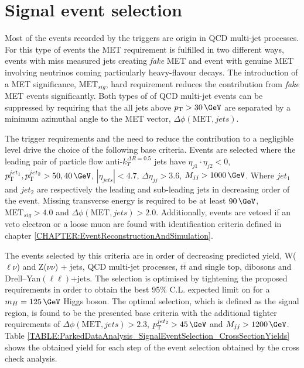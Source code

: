 \section{Signal event selection}
\label{SECTION:ParkedDataAnalysis_SignalEventSelection}


Most of the events recorded by the triggers are origin in \gls{QCD} multi-jet processes. For this type of events the \gls{MET} requirement is fulfilled in two different ways, events with miss measured jets creating \textit{fake} \gls{MET} and event with genuine \gls{MET} involving neutrinos coming particularly heavy-flavour decays. The introduction of a \gls{MET} significance, $\text{MET}_{sig}$, hard requirement reduces the contribution from \textit{fake} \gls{MET} events significantly. Both types of of \gls{QCD} multi-jet events can be suppressed by requiring that the all jets above $\pt>30\,\GeV$ are separated by a minimum azimuthal angle to the \gls{MET} vector, $\Delta\phi(\text{MET},jets)$.

The trigger requirements and the need to reduce the contribution to a negligible level drive the choice of the following base criteria. Events are selected where the leading pair of particle flow anti-$k_T^{\Delta R=0.5}$ jets have $\eta_{j1} \cdot \eta_{j2}<0$, $\pt^{jet_1},\pt^{jet_2} > 50,40\,\GeV$, $|\eta_{jets}| < 4.7$, $\Delta\eta_{jj}>3.6$, $M_{jj}>1000\,\GeV$.  Where $jet_1$ and $jet_2$ are respectively the leading and sub-leading jets in decreasing \pt order of the event. Missing transverse energy is required to be at least $90\,\GeV$, $\text{MET}_{sig}>4.0$ and $\Delta\phi(\text{MET},jets)>2.0$. Additionally, events are vetoed if an veto electron or a loose muon are found with identification criteria defined in chapter \ref{CHAPTER:EventReconstructionAndSimulation}.

The events selected by this criteria are in order of decreasing predicted yield, W($\ell\nu$) and Z($\nu\nu$) + jets, QCD multi-jet processes, $t\bar{t}$ and single top, dibosons and Drell--Yan$(\ell\ell)\text{+jets}$. The selection is optimised by tightening the proposed requirements in order to obtain the best 95\% C.L. expected limit on \BRinv for a $m_H=125\,\GeV$ Higgs boson. The optimal selection, which is defined as the signal region, is found to be the presented base criteria with the additional tighter requirements of $\Delta\phi(\text{MET},jets)>2.3$, $\pt^{jet_2}>45\,\GeV$ and $M_{jj}>1200\,\GeV$. Table \ref{TABLE:ParkedDataAnalysis_SignalEventSelection_CrossSectionYields} shows the obtained yield for each step of the event selection obtained by the cross check analysis.

